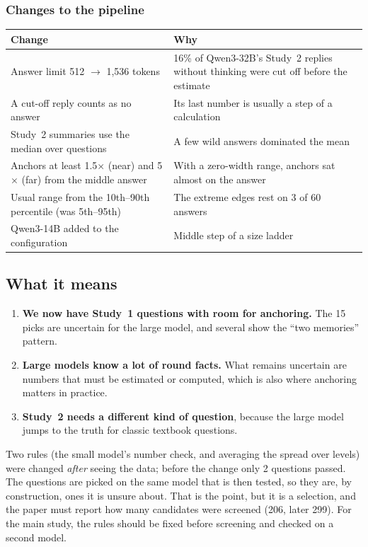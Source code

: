 \documentclass[11pt,a4paper]{article}
\begin{document}
\subsubsection{Changes to the pipeline}
\begin{center}\small
\begin{tabularx}{\textwidth}{@{}P{5.4cm}L@{}}
\toprule
Change & Why \\
\midrule
Answer limit 512 $\to$ 1,536 tokens & 16\% of Qwen3-32B's Study~2 replies without thinking were cut off before the estimate \\
A cut-off reply counts as no answer & Its last number is usually a step of a calculation \\
Study~2 summaries use the median over questions & A few wild answers dominated the mean \\
Anchors at least 1.5$\times$ (near) and 5$\times$ (far) from the middle answer & With a zero-width range, anchors sat almost on the answer \\
Usual range from the 10th--90th percentile (was 5th--95th) & The extreme edges rest on 3 of 60 answers \\
Qwen3-14B added to the configuration & Middle step of a size ladder \\
\bottomrule
\end{tabularx}
\end{center}

\subsection{What it means}
\begin{enumerate}[leftmargin=*]
  \item \textbf{We now have Study~1 questions with room for anchoring.} The 15 picks are uncertain for the large model, and several show the \enquote{two memories} pattern.
  \item \textbf{Large models know a lot of round facts.} What remains uncertain are numbers that must be estimated or computed, which is also where anchoring matters in practice.
  \item \textbf{Study~2 needs a different kind of question}, because the large model jumps to the truth for classic textbook questions.
\end{enumerate}

\begin{cautionbox}
Two rules (the small model's number check, and averaging the spread over levels) were changed \emph{after} seeing the data; before the change only 2 questions passed. The questions are picked on the same model that is then tested, so they are, by construction, ones it is unsure about. That is the point, but it is a selection, and the paper must report how many candidates were screened (206, later 299). For the main study, the rules should be fixed before screening and checked on a second model.
\end{cautionbox}
\end{document}
